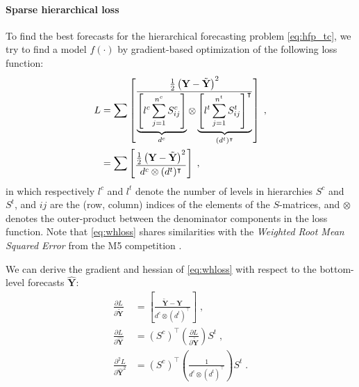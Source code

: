 \documentclass[preprint, 3p, times, twocolumn]{elsarticle}
\begin{document}
\paragraph{Sparse hierarchical loss} To find the best forecasts for the hierarchical forecasting problem \eqref{eq:hfp_tc}, we try to find a model \(f(\cdot)\) by gradient-based optimization of the following loss function:
\begin{align} \label{eq:whloss}
  L &= \sum \left[ \vcenter{\hbox{$\displaystyle \frac{ \frac{1}{2}\left(\textbf{Y} - \tilde{\textbf{Y}}\right)^2}{ \underbrace{\left[ l^{c} \sum_{j=1}^{n^c} S^c_{ij} \right]}_{d^c} \otimes \underbrace{\left[ l^{t} \sum_{j=1}^{n^t} S^t_{ij} \right]^\intercal}_{(d^t)^\intercal} } $}} \right] \; , \\
    &= \sum \left[ \vcenter{\hbox{$\displaystyle \frac{ \frac{1}{2}\left(\textbf{Y} - \tilde{\textbf{Y}}\right)^2}{ d^c \otimes (d^t)^\intercal } $}} \right] \; ,
\end{align}
in which respectively \(l^{c}\) and \(l^{t}\) denote the number of levels in hierarchies \(S^c\) and \(S^t\), and \(ij\) are the (row, column) indices of the elements of the \(S\)-matrices, and \(\otimes\) denotes the outer-product between the denominator components in the loss function. Note that \eqref{eq:whloss} shares similarities with the \textit{Weighted Root Mean Squared Error} from the M5 competition \cite{makridakis_m5_2022}.

We can derive the gradient and hessian of \eqref{eq:whloss} with respect to the bottom-level forecasts \(\hat{\textbf{Y}}\): 
\begin{align} 
  \frac{\partial L}{\partial \tilde{\textbf{Y}}} &=  \left[ \frac{\tilde{\textbf{Y}} - \textbf{Y}}{ d^c \otimes (d^t)^\intercal } \right] \;, \label{eq:hfp_grad} \\
  \frac{\partial L}{\partial \hat{\textbf{Y}}} &= (S^c)^\intercal \left(\frac{\partial L}{\partial \tilde{\textbf{Y}}}\right) S^t \;, \label{eq:hfpbu_grad}  \\
  \frac{\partial^2 L}{\partial \hat{\textbf{Y}}^2} &= (S^c)^\intercal \left( \frac{1}{d^c \otimes (d^t)^\intercal} \right) S^t \;. \label{eq:hfpbu_hess}                                         
\end{align}
\end{document}
